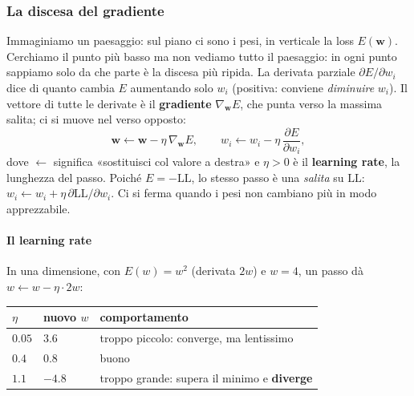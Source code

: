 \documentclass[12pt]{extarticle}
\begin{document}
\subsubsection{La discesa del gradiente}

\noindent Immaginiamo un paesaggio: sul piano ci sono i pesi, in verticale la loss $E(\mathbf{w})$. Cerchiamo il punto più basso ma non vediamo tutto il paesaggio: in ogni punto sappiamo solo da che parte è la discesa più ripida. La derivata parziale $\partial E/\partial w_i$ dice di quanto cambia $E$ aumentando solo $w_i$ (positiva: conviene \emph{diminuire} $w_i$). Il vettore di tutte le derivate è il \textbf{gradiente} $\nabla_\mathbf{w}E$, che punta verso la massima salita; ci si muove nel verso opposto:
\[
\mathbf{w}\leftarrow\mathbf{w}-\eta\,\nabla_\mathbf{w}E,
\qquad
w_i\leftarrow w_i-\eta\,\frac{\partial E}{\partial w_i},
\]
dove $\leftarrow$ significa «sostituisci col valore a destra» e $\eta>0$ è il \textbf{learning rate}, la lunghezza del passo. Poiché $E=-\mathrm{LL}$, lo stesso passo è una \emph{salita} su $\mathrm{LL}$: $w_i\leftarrow w_i+\eta\,\partial\mathrm{LL}/\partial w_i$. Ci si ferma quando i pesi non cambiano più in modo apprezzabile.

\begin{center}
\end{center}

\paragraph{Il learning rate}
In una dimensione, con $E(w)=w^2$ (derivata $2w$) e $w=4$, un passo dà $w\leftarrow w-\eta\cdot2w$:
\begin{center}
\small
\begin{tabular}{lll}
    \toprule
    $\eta$ & nuovo $w$ & comportamento \\
    \midrule
    $0.05$ & $3.6$ & troppo piccolo: converge, ma lentissimo \\
    $0.4$ & $0.8$ & buono \\
    $1.1$ & $-4.8$ & troppo grande: supera il minimo e \textbf{diverge} \\
    \bottomrule
\end{tabular}
\end{center}
\end{document}
